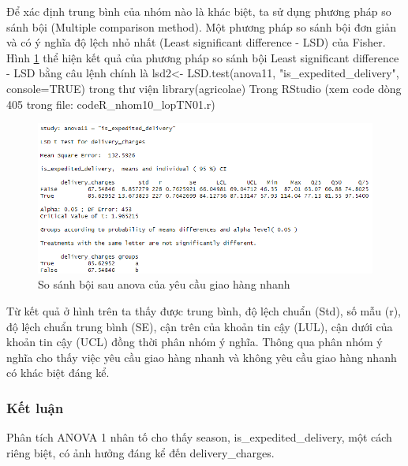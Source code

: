 Để xác định trung bình của nhóm nào là khác biệt, ta sử dụng phương pháp so sánh bội (Multiple comparison method). Một phương pháp so sánh bội đơn giản và có ý nghĩa độ lệch nhỏ nhất (Least significant difference - LSD) của Fisher. Hình \ref{fig:5.4} thể hiện kết quả của phương pháp so sánh bội Least significant difference - LSD bằng câu lệnh chính là lsd2<- LSD.test(anova11, "is\_expedited\_delivery", console=TRUE)
trong thư viện library(agricolae) Trong RStudio (xem code dòng 405 trong file: codeR\_nhom10\_lopTN01.r)
\begin{figure}[!htbp]
    \centering
    \includegraphics[width=0.6\linewidth]{graphics/5.3.4.png}
    \caption{So sánh bội sau anova của yêu cầu giao hàng nhanh}
    \label{fig:5.4}
\end{figure}
Từ kết quả ở hình trên ta thấy được trung bình, độ lệch chuẩn (Std), số mẫu (r), độ lệch chuẩn trung bình (SE), cận trên của khoản tin cậy (LUL), cận dưới của khoản tin cậy (UCL) đồng thời phân nhóm ý nghĩa. Thông qua phân nhóm ý nghĩa cho thấy việc yêu cầu giao hàng nhanh và không yêu cầu giao hàng nhanh có khác biệt đáng kể.

\subsubsection{Kết luận}
Phân tích ANOVA 1 nhân tố cho thấy season, is\_expedited\_delivery, một cách riêng biệt, có ảnh hưởng đáng kể đến delivery\_charges.